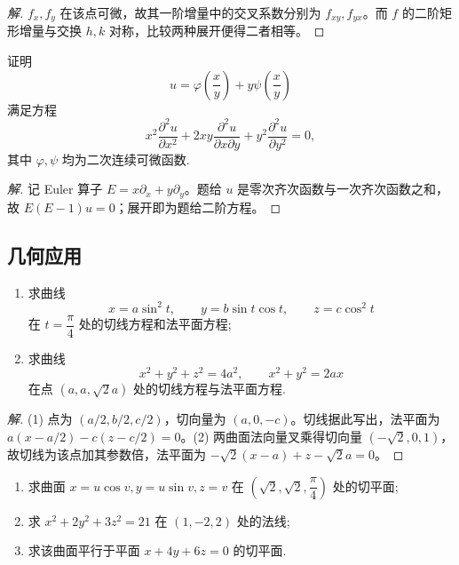 \documentclass[../../数学分析培优讲义(答案版).tex]{subfiles}
\begin{document}
\begin{proof}[解]
$f_x,f_y$ 在该点可微，故其一阶增量中的交叉系数分别为 $f_{xy},f_{yx}$。而 $f$ 的二阶矩形增量与交换 $h,k$ 对称，比较两种展开便得二者相等。
\end{proof}

\begin{example}
证明
\[
    u=\varphi\left(\dfrac{x}{y}\right)+y\psi\left(\dfrac{x}{y}\right)
\]
满足方程
\[
    x^2\dfrac{\partial^2u}{\partial x^2}
    +2xy\dfrac{\partial^2u}{\partial x\partial y}
    +y^2\dfrac{\partial^2u}{\partial y^2}=0,
\]
其中 $\varphi,\psi$ 均为二次连续可微函数.
\end{example}

\begin{proof}[解]
记 Euler 算子 $E=x\partial_x+y\partial_y$。题给 $u$ 是零次齐次函数与一次齐次函数之和，故 $E(E-1)u=0$；展开即为题给二阶方程。
\end{proof}

\subsection{几何应用}

\begin{example}
\begin{enumerate}[label=(\arabic*)]
    \item 求曲线
    \[
        x=a\sin^2t,\qquad y=b\sin t\cos t,\qquad z=c\cos^2t
    \]
    在 $t=\dfrac{\pi}{4}$ 处的切线方程和法平面方程;
    \item 求曲线
    \[
        x^2+y^2+z^2=4a^2,\qquad x^2+y^2=2ax
    \]
    在点 $(a,a,\sqrt{2}a)$ 处的切线方程与法平面方程.
\end{enumerate}
\end{example}

\begin{proof}[解]
(1) 点为 $(a/2,b/2,c/2)$，切向量为 $(a,0,-c)$。切线据此写出，法平面为 $a(x-a/2)-c(z-c/2)=0$。(2) 两曲面法向量叉乘得切向量 $(-\sqrt{2},0,1)$，故切线为该点加其参数倍，法平面为 $-\sqrt{2}(x-a)+z-\sqrt{2}a=0$。
\end{proof}

\begin{example}
\begin{enumerate}[label=(\arabic*)]
    \item 求曲面 $x=u\cos v,y=u\sin v,z=v$ 在 $(\sqrt{2},\sqrt{2},\dfrac{\pi}{4})$ 处的切平面;
    \item 求 $x^2+2y^2+3z^2=21$ 在 $(1,-2,2)$ 处的法线;
    \item 求该曲面平行于平面 $x+4y+6z=0$ 的切平面.
\end{enumerate}
\end{example}
\end{document}
